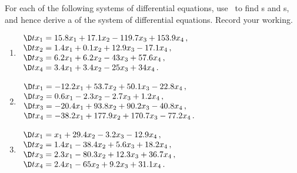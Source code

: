\begin{exercise}  
For each of the following systems of differential equations, use \script\ to find s and s, and hence derive a  of the system of differential equations.  
Record your working.

\begin{enumerate}
\item \(\begin{array}{l} 
\D t{x_1}= 15.8x_1 +17.1x_2 -119.7x_3 +153.9x_4\,,\\
\D t{x_2}= 1.4x_1 +0.1x_2 +12.9x_3 -17.1x_4\,,\\
\D t{x_3}= 6.2x_1 +6.2x_2 -43x_3 +57.6x_4\,,\\
\D t{x_4}= 3.4x_1 +3.4x_2 -25x_3 +34x_4\,.
\end{array}\)
\setbox\ajrqrbox\hbox{}\marginajrbox%

\item \(\begin{array}{l} 
\D t{x_1}= -12.2x_1 +53.7x_2 +50.1x_3 -22.8x_4\,,\\
\D t{x_2}= 0.6x_1 -2.3x_2 -2.7x_3 +1.2x_4\,,\\
\D t{x_3}= -20.4x_1 +93.8x_2 +90.2x_3 -40.8x_4\,,\\
\D t{x_4}= -38.2x_1 +177.9x_2 +170.7x_3 -77.2x_4\,.
\end{array}\)
\setbox\ajrqrbox\hbox{}\marginajrbox%

\item \(\begin{array}{l} 
\D t{x_1}= x_1 +29.4x_2 -3.2x_3 -12.9x_4\,,\\
\D t{x_2}= 1.4x_1 -38.4x_2 +5.6x_3 +18.2x_4\,,\\
\D t{x_3}= 2.3x_1 -80.3x_2 +12.3x_3 +36.7x_4\,,\\
\D t{x_4}= 2.4x_1 -65x_2 +9.2x_3 +31.1x_4\,.
\end{array}\)
\setbox\ajrqrbox\hbox{}\marginajrbox%


\end{enumerate}
\end{exercise}
